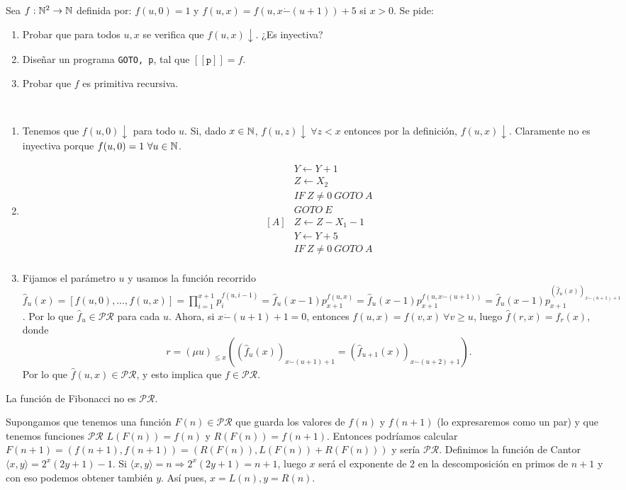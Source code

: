 \documentclass[twoside]{article}
\newcommand{\PR}{\mathcal{PR}}
\begin{document}
\begin{ejercicio}{22}
Sea $f : \mathbb{N}^2 \to \mathbb{N}$ definida por: $f(u, 0) = 1$ y $f(u, x) = f(u, x\dot{-}
(u+1))+5$ si $x > 0$.
Se pide:
\begin{enumerate}
\item Probar que para todos $u, x$ se verifica que $f(u, x)\downarrow$. ¿Es inyectiva?
\item Diseñar un programa \texttt{GOTO, p}, tal que $[\![\texttt{p}]\!] = f$.
\item Probar que $f$ es primitiva recursiva.
\end{enumerate}
\end{ejercicio}
\begin{solucion}\
\begin{enumerate}
\item Tenemos que $f(u,0)\downarrow$ para todo $u$. Si, dado $x\in\mathbb{N}$, $f(u,z)\downarrow\ \forall z< x$ entonces por la definición, $f(u,x)\downarrow$. Claramente no es inyectiva porque $f(u,0)=1\ \forall u\in\N$. 
\item 
\begin{align*}
& Y\leftarrow Y+1\\
& Z\leftarrow X_2\\
& IF\ Z\neq 0\ GOTO\ A\\
& GOTO\ E\\
[A]& Z\leftarrow Z-X_1-1\\
& Y\leftarrow Y+5\\
& IF\ Z\neq 0\ GOTO\ A\\
\end{align*}
\item Fijamos el parámetro $u$ y usamos la función recorrido $\hat{f}_u(x)=[f(u,0),\dots,f(u,x)]=\prod_{i=1}^{x+1}p_i^{f(u,i-1)}=\hat{f}_u(x-1)p_{x+1}^{f(u,x)}=\hat{f}_u(x-1)p_{x+1}^{f(u,x\dot{-}(u+1))}=\hat{f}_u(x-1)p_{x+1}^{(\hat{f}_u(x))_{x\dot{-}(u+1)+1}}$. Por lo que $\hat{f}_u\in\PR$ para cada $u$. Ahora, si $x\dot{-}(u+1)+1=0$, entonces $f(u,x)=f(v,x)\ \forall v\geq u$, luego $\hat{f}(r,x)=\hat{f}_r(x)$, donde $$r=(\mu u)_{\leq x}((\hat{f}_u(x))_{x\dot{-}(u+1)+1}=(\hat{f}_{u+1}(x))_{x\dot{-}(u+2)+1}).$$ Por lo que $\hat{f}(u,x)\in\PR$, y esto implica que $f\in\PR$. 
\end{enumerate}
\end{solucion}
\newpage

\begin{ejercicio}{}
La función de Fibonacci no es $\mathcal{PR}$.
\end{ejercicio}
\begin{solucion}
Supongamos que tenemos una función $F(n)\in\mathcal{PR}$ que guarda los valores de $f(n)$ y $f(n+1)$ (lo expresaremos como un par) y que tenemos funciones $\mathcal{PR}$ $L(F(n))=f(n)$ y $R(F(n))=f(n+1)$. Entonces podríamos calcular $F(n+1)=(f(n+1),f(n+1))=(R(F(n)), L(F(n))+R(F(n)))$ y sería $\mathcal{PR}$. Definimos la función de Cantor $\langle x,y\rangle =2^x(2y+1)-1$. Si $\langle x,y\rangle =n\Rightarrow 2^x(2y+1)=n+1$, luego $x$ será el exponente de 2 en la descomposición en primos de $n+1$ y con eso podemos obtener también $y$. Así pues, $x=L(n), y=R(n)$. 
\end{solucion}
\end{document}
